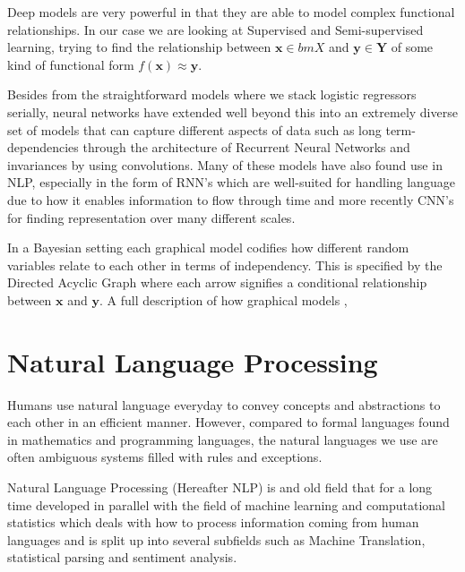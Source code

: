 Deep models are very powerful in that they are able to model complex functional
relationships. In our case we are looking at Supervised and Semi-supervised
learning, trying to find the relationship between $\bm{x} \in bm{X}$ and $\bm{y}
\in \bm{Y}$ of some kind of functional form $f(\bm{x}) \approx \bm{y}$.

Besides from the straightforward models where we stack logistic regressors
serially, neural networks have extended well beyond this into an extremely
diverse set of models that can capture different aspects of data such as long
term-dependencies through the architecture of Recurrent Neural Networks and
invariances by using convolutions. Many of these models have also found use in
NLP, especially in the form of RNN's which are well-suited for handling
language due to how it enables information to flow through
time\cite{graves_generating_2013}\cite{cho_learning_2014} and more recently
CNN's for finding representation over many different
scales\cite{semeniuta_hybrid_2017}\cite{yang_improved_2017}\cite{gehring_convolutional_2016}.

In a Bayesian setting each graphical model codifies how different random variables relate
to each other in terms of independency. This is specified by the Directed
Acyclic Graph where each arrow signifies a conditional relationship between
$\bm{x}$ and $\bm{y}$. A full description of how graphical models ,

\section{Natural Language Processing}

Humans use natural language everyday to convey concepts and abstractions to each
other in an efficient manner. However, compared to formal languages found in
mathematics and programming languages, the natural languages we use are often
ambiguous systems filled with rules and exceptions\cite{Rosenfeld00twodecades, sep-computational-linguistics}.

Natural Language Processing (Hereafter NLP) is and old field that for a long
time developed in parallel with the field of machine learning and
computational statistics which deals with how to process information coming from
human languages and is split up into several subfields such as Machine
Translation, statistical parsing and sentiment analysis\cite{sep-computational-linguistics}.

